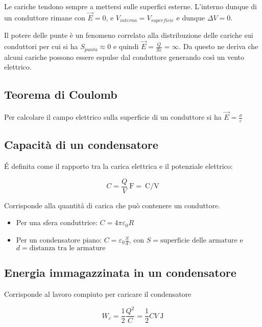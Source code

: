 Le cariche tendono sempre a mettersi sulle superfici esterne.
L'interno dunque di un conduttore rimane con $\vec{E} = 0$, e $V_{interna} = V_{superficie}$ e dunque $\Delta V = 0$.

Il potere delle punte è un fenomeno correlato alla distribuzione delle cariche sui conduttori per cui si ha $S_{punta} \approx 0$ e quindi $\vec{E} = \frac{Q}{S\varepsilon} = \infty$.
Da questo ne deriva che alcuni cariche possono essere espulse dal conduttore generando così un vento elettrico.

\subsection{Teorema di Coulomb}

Per calcolare il campo elettrico sulla superficie di un conduttore si ha $\vec{E} = \frac{\sigma}{\varepsilon}$


\subsection{Capacità di un condensatore}

É definita come il rapporto tra la carica elettrica e il potenziale elettrico:

\begin{equation*}
    C = \frac{Q}{V} \SI{}{\farad} = \SI{}{\coulomb\per\volt}
\end{equation*}

Corrisponde alla quantità di carica che può contenere un conduttore.

\begin{itemize}
    \item Per una sfera conduttrice: $C = 4\pi\varepsilon_0 R$
    \item Per un condensatore piano: $C = \varepsilon_0 \frac{S}{d}$, con $S = \text{superficie delle armature}$ e $d = \text{distanza tra le armature}$
\end{itemize}

\subsection{Energia immagazzinata in un condensatore}

Corrisponde al lavoro compiuto per caricare il condensatore

\begin{equation*}
    W_c = \frac{1}{2} \frac{Q^2}{C} = \frac{1}{2} C V \SI{}{\joule}
\end{equation*}

